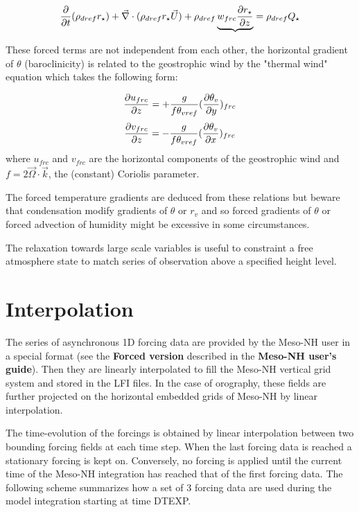 \begin{equation}
{\partial \over \partial t}(\rho_{dref} r_\star) + \vec \nabla \cdot
(\rho_{dref} r_\star \vec U)+ \rho_{dref}
\underbrace{w_{frc} \dfrac{\partial r_\star }{\partial z}} = \rho_{dref} Q_\star
\end{equation}

\bigskip
These forced terms are not independent from each other, the horizontal
gradient of $\theta$ (baroclinicity) is related to the geostrophic wind by
the "thermal wind" equation which takes the following form:

\begin{equation}
\dfrac{\partial u_{frc}}{\partial z} = + {g \over f \theta_{vref}} (\dfrac{\partial \theta_v}
{\partial y} )_{frc}
\end{equation}
\begin{equation}
\dfrac{\partial v_{frc}}{\partial z} = - {g \over f \theta_{vref}} (\dfrac{\partial \theta_v}
{\partial x} )_{frc}
\end{equation}
where $u_{frc}$ and $v_{frc}$ are the horizontal components of the geostrophic
wind and $f = 2 \vec \Omega \cdot \vec k$, the (constant) Coriolis parameter.

The forced temperature gradients are deduced from these relations but beware
that condensation modify gradients of $\theta$ or $r_{v}$ and so forced
gradients of $\theta$ or forced advection of humidity might be excessive in
some circumstances.

The relaxation towards large scale variables is useful to constraint a free
atmosphere state to match series of observation above a specified height level.

\section{Interpolation}
The series of asynchronous 1D forcing data are provided by the Meso-NH user
in a special format (see the {\bf Forced version} described in the
{\bf Meso-NH user's guide}).
Then they are linearly interpolated to fill the Meso-NH vertical grid system
and stored in the LFI files.
In the case of orography, these fields are further projected on the horizontal
embedded grids of Meso-NH by linear interpolation.

The time-evolution of the forcings is obtained by linear interpolation between
two bounding forcing fields at each time step. When the last forcing data is
reached a stationary forcing is kept on. Conversely, no forcing is applied
until the current time of the Meso-NH integration has reached that of the first
forcing data. The following scheme summarizes how a set of 3 forcing data are
used during the model integration starting at time DTEXP.

